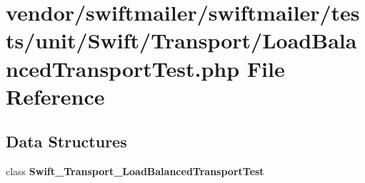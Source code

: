 \section{vendor/swiftmailer/swiftmailer/tests/unit/\+Swift/\+Transport/\+Load\+Balanced\+Transport\+Test.php File Reference}
\label{_load_balanced_transport_test_8php}
\subsection*{Data Structures}
\begin{DoxyCompactItemize}
\item 
class {\bf Swift\+\_\+\+Transport\+\_\+\+Load\+Balanced\+Transport\+Test}
\end{DoxyCompactItemize}
